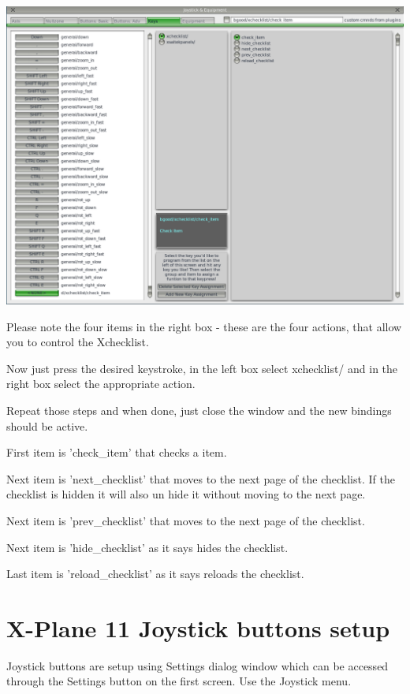 \documentclass[11pt,parskip=half,a4paper]{scrartcl}
\begin{document}
\begin{center}
\includegraphics[width=17cm]{XchecklistUserManual-img002.png}
\end{center}

Please note the four items in the right box - these are the four actions, that allow you to control the 
Xchecklist. 

Now just press the desired keystroke, in the left box select xchecklist/ and in the right box select the 
appropriate action. 

Repeat those steps and when done, just close the window and the new bindings should be active. 

First item is 'check\_item' that checks a item. 

Next item is 'next\_checklist' that moves to the next page of the checklist. If the checklist is hidden it 
will also un hide it without moving to the next page. 

Next item is 'prev\_checklist' that moves to the next page of the checklist.

Next item is 'hide\_checklist' as it says hides the checklist.

Last item is 'reload\_checklist' as it says reloads the checklist.

\newpage
\section{X-Plane 11 Joystick buttons setup}

Joystick buttons are setup using Settings dialog window which can be accessed through the Settings button on the first screen. Use the Joystick menu.
\end{document}
